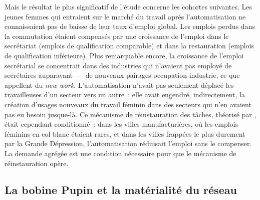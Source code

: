 %
Mais le résultat le plus significatif de l'étude concerne les cohortes suivantes. Les jeunes femmes qui entraient sur le marché du travail après l'automatisation ne connaissaient pas de baisse de leur taux d'emploi global. Les emplois perdus dans la commutation étaient compensés par une croissance de l'emploi dans le secrétariat (emplois de qualification comparable) et dans la restauration (emplois de qualification inférieure). Plus remarquable encore, la croissance de l'emploi secrétarial se concentrait dans des industries qui n'avaient pas employé de secrétaires auparavant~--- de nouveaux pairages occupation-industrie, ce que \textcite{autor_new_2024} appellent du \og \emph{new work}\fg{}. L'automatisation n'avait pas seulement déplacé les travailleuses d'un secteur vers un autre~; elle avait engendré, indirectement, la création d'usages nouveaux du travail féminin dans des secteurs qui n'en avaient pas eu besoin jusque-là. Ce mécanisme de réinstauration des tâches, théorisé par \textcite{acemoglu_race_2018}, était cependant conditionné~: dans les villes manufacturières, où les emplois féminins en col blanc étaient rares, et dans les villes frappées le plus durement par la Grande Dépression, l'automatisation réduisait l'emploi sans le compenser. La demande agrégée est une condition nécessaire pour que le mécanisme de réinstauration opère.



\subsection{La bobine Pupin et la matérialité du réseau}\label{subsec:pupin}

